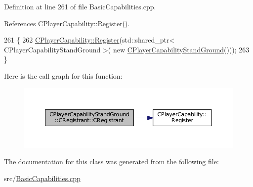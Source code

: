 Definition at line 261 of file Basic\+Capabilities.\+cpp.



References C\+Player\+Capability\+::\+Register().


\begin{DoxyCode}
261                                                     \{
262     \hyperlink{classCPlayerCapability_a7e298018dcde2684451add3cfff065f7}{CPlayerCapability::Register}(std::shared\_ptr< CPlayerCapabilityStandGround >(\textcolor{keyword}{
      new} \hyperlink{classCPlayerCapabilityStandGround_a58f0601edbe114a45ff27b84027afd09}{CPlayerCapabilityStandGround}()));   
263 \}
\end{DoxyCode}
Here is the call graph for this function\+:\nopagebreak
\begin{figure}[H]
\begin{center}
\leavevmode
\includegraphics[width=350pt]{classCPlayerCapabilityStandGround_1_1CRegistrant_ad7c015829711721bab4ce08ef385e8ea_cgraph}
\end{center}
\end{figure}


The documentation for this class was generated from the following file\+:\begin{DoxyCompactItemize}
\item 
src/\hyperlink{BasicCapabilities_8cpp}{Basic\+Capabilities.\+cpp}\end{DoxyCompactItemize}
